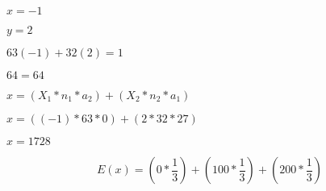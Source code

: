 \documentclass[10pt]{book}
\begin{document}
\begin{mdSnippets}
\begin{mdInlineSnippet}[7c477670495296c99a5898d116e275fc]
$x = -1$\end{mdInlineSnippet}%
\begin{mdInlineSnippet}[5f08418eb7c8408d717c2e2fe422ab3c]%
$y = 2$\end{mdInlineSnippet}%
\begin{mdInlineSnippet}[486403d69ed67c2c47243be9dbed6f83]%
$63(-1) + 32(2) = 1$\end{mdInlineSnippet}%
\begin{mdInlineSnippet}[d9c1da9e08cb0b4e2fe07dd36883dc9b]%
$64 = 64$\end{mdInlineSnippet}%
\begin{mdInlineSnippet}[49507d99d5c48e065a155a4a7acfa970]%
$x = (X_1 * n_1 * a_2) + (X_2 * n_2 * a_1)$\end{mdInlineSnippet}%
\begin{mdInlineSnippet}[38f1149d8d903f4fa7c3b6871905ece0]%
$x = ((-1) * 63 * 0) + (2 * 32 * 27)$\end{mdInlineSnippet}%
\begin{mdInlineSnippet}[1bbfc0067d3cc3321ba2682f0f4207d9]%
$x = 1728$\end{mdInlineSnippet}%
\begin{mdDisplaySnippet}[b4236f6f002d471f64c27927560a1a95]%
\[%
E(x) = (0 * \frac{1} {3}) + (100 * \frac{1} {3}) + (200 * \frac{1} {3})
\]%
\end{mdDisplaySnippet}%

\end{mdSnippets}
\end{document}
